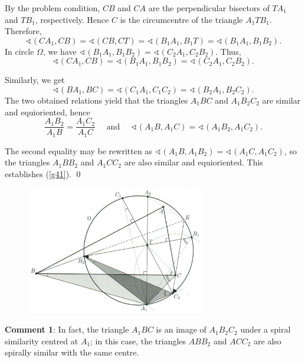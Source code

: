 \documentclass[a4paper, 12pt]{article}
\begin{document}
\begin{enumerate}
By the problem condition, $CB$ and $CA$ are the perpendicular bisectors of $TA_1$ and $TB_1$, respectively. Hence $C$ is the circumcentre of the triangle $A_1 T B_1$. Therefore,
$$
\sphericalangle (CA_1, CB) = \sphericalangle (CB, CT) = \sphericalangle (B_1 A_1, B_1T) = \sphericalangle (B_1 A_1, B_1 B_2).
$$
In circle $\Omega$, we have $\sphericalangle (B_1 A_1, B_1 B_2) = \sphericalangle (C_2 A_1, C_2 B_2)$. Thus,
\begin{equation} \label{g42}
    \sphericalangle(CA_1, CB) = \sphericalangle(B_1 A_1, B_1 B_2) = \sphericalangle(C_2 A_1, C_2 B_2).
\end{equation}

Similarly, we get
\begin{equation} \label{g43}
\sphericalangle (BA_1, BC) = \sphericalangle (C_1 A_1, C_1 C_2) = \sphericalangle (B_2 A_1, B_2 C_2).
\end{equation}
The two obtained relations yield that the triangles $A_1 BC$ and $A_1 B_2 C_2$ are similar and equioriented, hence
$$
\frac{A_1 B_2}{A_1 B} = \frac{A_1 C_2}{A_1 C} \quad 
\textrm{ and } \quad 
\sphericalangle(A_1 B, A_1 C) = \sphericalangle (A_1 B_2, A_1 C_2).
$$

The second equality may be rewritten as $\sphericalangle(A_1 B, A_1 B_2) = \sphericalangle (A_1 C, A_1 C_2)$, so the triangles $A_1 B B_2$ and $A_1 C C_2$ are also similar and equioriented. This establishes (\ref{g41}). \qed

\begin{figure}[h]
    \centering
    \includegraphics[width = 0.7\textwidth]{2018_G4}
\end{figure}
\vspace{4mm}

\textbf{Comment 1}:  In fact, the triangle $A_1 B C$ is an image of $A_1 B_2 C_2$ under a spiral similarity centred at $A_1$; in this case, the triangles $A B B_2$ and $A C C_2$ are also spirally similar with the same centre. \\


\end{enumerate}
\end{document}
